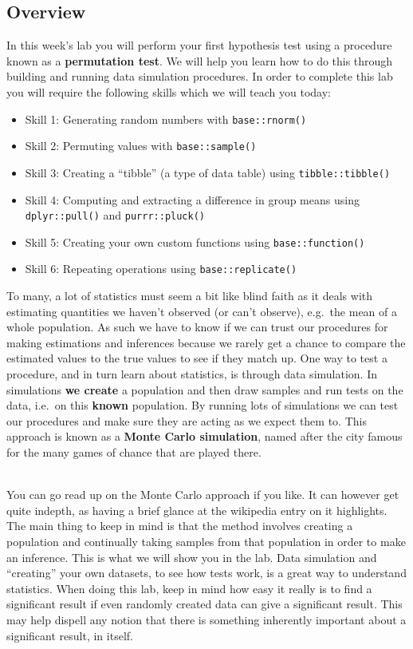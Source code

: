 \documentclass[]{book}
\providecommand{\tightlist}{%
  \setlength{\itemsep}{0pt}\setlength{\parskip}{0pt}}
\newenvironment{info}
    {
    \hline\\
    }
    { 
    \\\\\hline
    }
\begin{document}
\hypertarget{overview-1}{%
\subsection{Overview}\label{overview-1}}

In this week's lab you will perform your first hypothesis test using a procedure known as a \textbf{permutation test}. We will help you learn how to do this through building and running data simulation procedures. In order to complete this lab you will require the following skills which we will teach you today:

\begin{itemize}
\tightlist
\item
  Skill 1: Generating random numbers with \texttt{base::rnorm()}
\item
  Skill 2: Permuting values with \texttt{base::sample()}\\
\item
  Skill 3: Creating a ``tibble'' (a type of data table) using \texttt{tibble::tibble()}
\item
  Skill 4: Computing and extracting a difference in group means using \texttt{dplyr::pull()} and \texttt{purrr::pluck()}
\item
  Skill 5: Creating your own custom functions using \texttt{base::function()}
\item
  Skill 6: Repeating operations using \texttt{base::replicate()}
\end{itemize}

To many, a lot of statistics must seem a bit like blind faith as it deals with estimating quantities we haven't observed (or can't observe), e.g.~the mean of a whole population. As such we have to know if we can trust our procedures for making estimations and inferences because we rarely get a chance to compare the estimated values to the true values to see if they match up. One way to test a procedure, and in turn learn about statistics, is through data simulation. In simulations \textbf{we create} a population and then draw samples and run tests on the data, i.e.~on this \textbf{known} population. By running lots of simulations we can test our procedures and make sure they are acting as we expect them to. This approach is known as a \textbf{Monte Carlo simulation}, named after the city famous for the many games of chance that are played there.

\begin{info}
You can go read up on the Monte Carlo approach if you like. It can
however get quite indepth, as having a brief glance at the wikipedia
entry on it highlights. The main thing to keep in mind is that the
method involves creating a population and continually taking samples
from that population in order to make an inference. This is what we will
show you in the lab. Data simulation and ``creating'' your own datasets,
to see how tests work, is a great way to understand statistics. When
doing this lab, keep in mind how easy it really is to find a significant
result if even randomly created data can give a significant result. This
may help dispell any notion that there is something inherently important
about a significant result, in itself.
\end{info}
\end{document}
